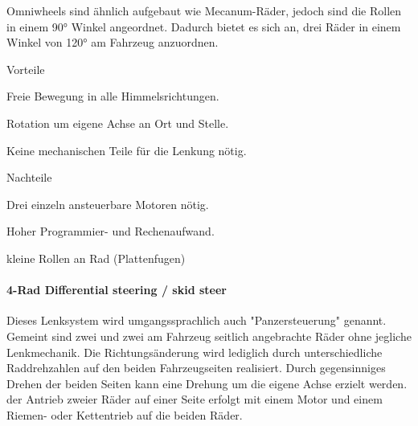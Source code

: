 \documentclass[../main.tex]{subfiles}
\begin{document}
Omniwheels sind ähnlich aufgebaut wie Mecanum-Räder, jedoch sind die Rollen in einem 90° Winkel angeordnet. Dadurch bietet es sich an, drei Räder in einem Winkel von 120° am Fahrzeug anzuordnen.

\begin{minipage}[t]{0.48\textwidth}
    \begin{items}
        \item[Vorteile]
        \item Freie Bewegung in alle Himmelsrichtungen.
      \item Rotation um eigene Achse an Ort und Stelle.
      \item Keine mechanischen Teile für die Lenkung nötig.
    \end{items}
\end{minipage}
\begin{minipage}[t]{0.48\textwidth}
    \begin{items}
      \item [Nachteile]
      \item Drei einzeln ansteuerbare Motoren nötig.
      \item Hoher Programmier- und Rechenaufwand.
      \item kleine Rollen an Rad (Plattenfugen)
    \end{items}
\end{minipage}

\paragraph{4-Rad Differential steering / skid steer}
Dieses Lenksystem wird umgangssprachlich auch "Panzersteuerung" genannt. Gemeint sind zwei und zwei am Fahrzeug seitlich angebrachte Räder ohne jegliche Lenkmechanik. Die Richtungsänderung wird lediglich durch unterschiedliche Raddrehzahlen auf den beiden Fahrzeugseiten realisiert. Durch gegensinniges Drehen der beiden Seiten kann eine Drehung um die eigene Achse erzielt werden. der Antrieb zweier Räder auf einer Seite erfolgt mit einem Motor und einem Riemen- oder Kettentrieb auf die beiden Räder.
\end{document}
